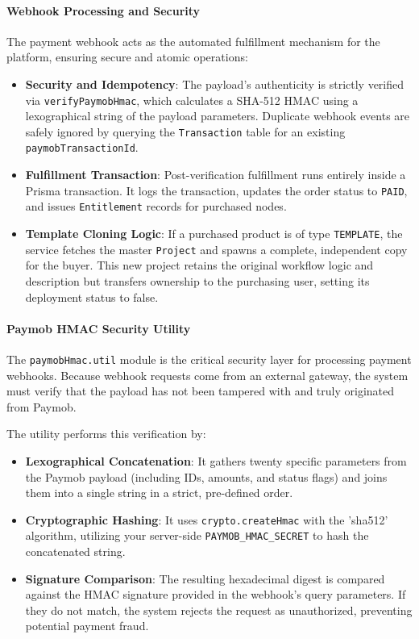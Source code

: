 \paragraph{Webhook Processing and Security}
The payment webhook acts as the automated fulfillment mechanism for the platform, ensuring secure and atomic operations:
\begin{itemize}
    \item \textbf{Security and Idempotency}: The payload's authenticity is strictly verified via \texttt{verifyPaymobHmac}, which calculates a SHA-512 HMAC using a lexographical string of the payload parameters. Duplicate webhook events are safely ignored by querying the \texttt{Transaction} table for an existing \texttt{paymobTransactionId}.
    \item \textbf{Fulfillment Transaction}: Post-verification fulfillment runs entirely inside a Prisma transaction. It logs the transaction, updates the order status to \texttt{PAID}, and issues \texttt{Entitlement} records for purchased nodes. 
    \item \textbf{Template Cloning Logic}: If a purchased product is of type \texttt{TEMPLATE}, the service fetches the master \texttt{Project} and spawns a complete, independent copy for the buyer. This new project retains the original workflow logic and description but transfers ownership to the purchasing user, setting its deployment status to false.
\end{itemize}
\paragraph{Paymob HMAC Security Utility}
The \texttt{paymobHmac.util} module is the critical security layer for processing payment webhooks. Because webhook requests come from an external gateway, the system must verify that the payload has not been tampered with and truly originated from Paymob.

The utility performs this verification by:
\begin{itemize}
    \item \textbf{Lexographical Concatenation}: It gathers twenty specific parameters from the Paymob payload (including IDs, amounts, and status flags) and joins them into a single string in a strict, pre-defined order.
    \item \textbf{Cryptographic Hashing}: It uses \texttt{crypto.createHmac} with the 'sha512' algorithm, utilizing your server-side \texttt{PAYMOB\_HMAC\_SECRET} to hash the concatenated string.
    \item \textbf{Signature Comparison}: The resulting hexadecimal digest is compared against the HMAC signature provided in the webhook's query parameters. If they do not match, the system rejects the request as unauthorized, preventing potential payment fraud.
\end{itemize}

